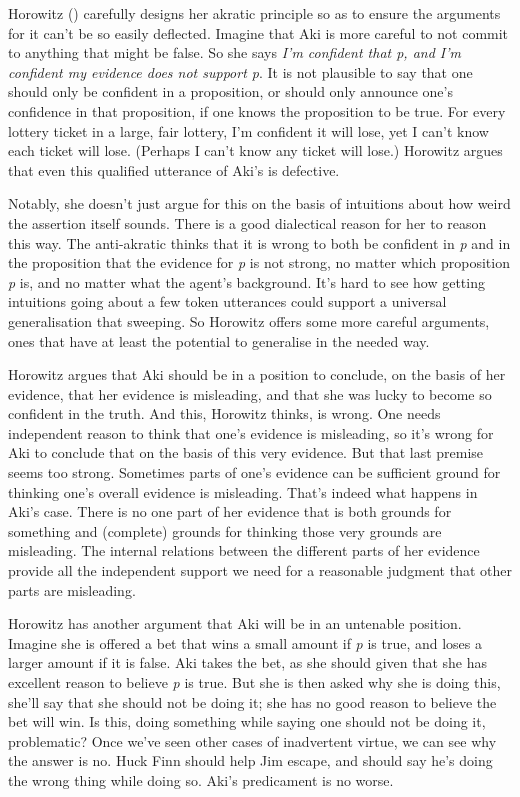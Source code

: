 \documentclass[
  10pt,
  letterpaper,
  twoside]{scrbook}
\begin{document}
Horowitz () carefully designs her
akratic principle so as to ensure the arguments for it can't be so
easily deflected. Imagine that {Aki} is more careful to not commit to
anything that might be false. So she says \emph{I'm confident that p,
and I'm confident my evidence does not support p}. It is not plausible
to say that one should only be confident in a proposition, or should
only announce one's confidence in that proposition, if one knows the
proposition to be true. For every lottery ticket in a large, fair
lottery, I'm confident it will lose, yet I can't know each ticket will
lose. (Perhaps I can't know any ticket will lose.) Horowitz argues that
even this qualified utterance of {Aki}'s is defective.

Notably, she doesn't just argue for this on the basis of intuitions
about how weird the assertion itself sounds. There is a good dialectical
reason for her to reason this way. The anti-akratic thinks that it is
wrong to both be confident in \emph{p} and in the proposition that the
evidence for \emph{p} is not strong, no matter which proposition
\emph{p} is, and no matter what the agent's background. It's hard to see
how getting intuitions going about a few token utterances could support
a universal generalisation that sweeping. So Horowitz offers some more
careful arguments, ones that have at least the potential to generalise
in the needed way.

Horowitz argues that {Aki} should be in a position to conclude, on the
basis of her evidence, that her evidence is misleading, and that she was
lucky to become so confident in the truth. And this, Horowitz thinks, is
wrong. One needs independent reason to think that one's evidence is
misleading, so it's wrong for {Aki} to conclude that on the basis of
this very evidence. But that last premise seems too strong. Sometimes
parts of one's evidence can be sufficient ground for thinking one's
overall evidence is misleading. That's indeed what happens in {Aki}'s
case. There is no one part of her evidence that is both grounds for
something and (complete) grounds for thinking those very grounds are
misleading. The internal relations between the different parts of her
evidence provide all the independent support we need for a reasonable
judgment that other parts are misleading.

Horowitz has another argument that {Aki} will be in an untenable
position. Imagine she is offered a bet that wins a small amount if
\emph{p} is true, and loses a larger amount if it is false. {Aki} takes
the bet, as she should given that she has excellent reason to believe
\emph{p} is true. But she is then asked why she is doing this, she'll
say that she should not be doing it; she has no good reason to believe
the bet will win. Is this, doing something while saying one should not
be doing it, problematic? Once we've seen other cases of inadvertent
virtue, we can see why the answer is no. {Huck} Finn should help Jim
escape, and should say he's doing the wrong thing while doing so.
{Aki}'s predicament is no worse.
\end{document}
